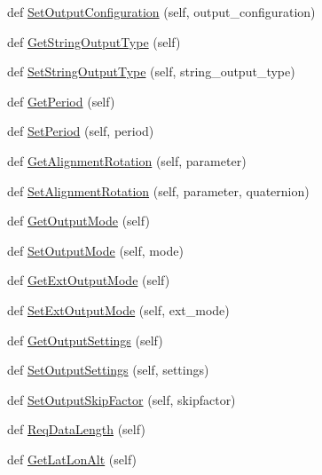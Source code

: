 \begin{DoxyCompactItemize}
\item 
def \hyperlink{classmtdevice_1_1MTDevice_a53c95416ed262990d70b667497a44d71}{Set\+Output\+Configuration} (self, output\+\_\+configuration)
\item 
def \hyperlink{classmtdevice_1_1MTDevice_ab265cda5a90f2089720c4028a6d64d45}{Get\+String\+Output\+Type} (self)
\item 
def \hyperlink{classmtdevice_1_1MTDevice_a7ef3bdc62f343cb2ba1b7b497c83cda3}{Set\+String\+Output\+Type} (self, string\+\_\+output\+\_\+type)
\item 
def \hyperlink{classmtdevice_1_1MTDevice_a9964a8f360efe414c9bd84d173cff963}{Get\+Period} (self)
\item 
def \hyperlink{classmtdevice_1_1MTDevice_a7421eafc5d4d03fc6e7d419dd5d687e4}{Set\+Period} (self, period)
\item 
def \hyperlink{classmtdevice_1_1MTDevice_a4473bb21765c708b18803fc26d8cc4d2}{Get\+Alignment\+Rotation} (self, parameter)
\item 
def \hyperlink{classmtdevice_1_1MTDevice_ad7f11554fdb3d2ce24d2ca081ca972c6}{Set\+Alignment\+Rotation} (self, parameter, quaternion)
\item 
def \hyperlink{classmtdevice_1_1MTDevice_af193eb2f64536239389fb4ba83a21d86}{Get\+Output\+Mode} (self)
\item 
def \hyperlink{classmtdevice_1_1MTDevice_a1e990d315750492fa1afbd49990959cc}{Set\+Output\+Mode} (self, mode)
\item 
def \hyperlink{classmtdevice_1_1MTDevice_a66e75cf601b0a7cfef3f456300d7520d}{Get\+Ext\+Output\+Mode} (self)
\item 
def \hyperlink{classmtdevice_1_1MTDevice_a5cd787accdbf2aec47fc0edf2835df40}{Set\+Ext\+Output\+Mode} (self, ext\+\_\+mode)
\item 
def \hyperlink{classmtdevice_1_1MTDevice_a782fd0b3a63007569b8c009ae7c1d8cc}{Get\+Output\+Settings} (self)
\item 
def \hyperlink{classmtdevice_1_1MTDevice_ac8f77a2d1d393aea71a7790929791cc0}{Set\+Output\+Settings} (self, settings)
\item 
def \hyperlink{classmtdevice_1_1MTDevice_a00ae63328881e07081d07a385ecfe858}{Set\+Output\+Skip\+Factor} (self, skipfactor)
\item 
def \hyperlink{classmtdevice_1_1MTDevice_a948beab4131a0748c8943d5abce96394}{Req\+Data\+Length} (self)
\item 
def \hyperlink{classmtdevice_1_1MTDevice_a80fa3cd0b6bf97a2ba46771e891d3fd1}{Get\+Lat\+Lon\+Alt} (self)
\item 

\end{DoxyCompactItemize}
